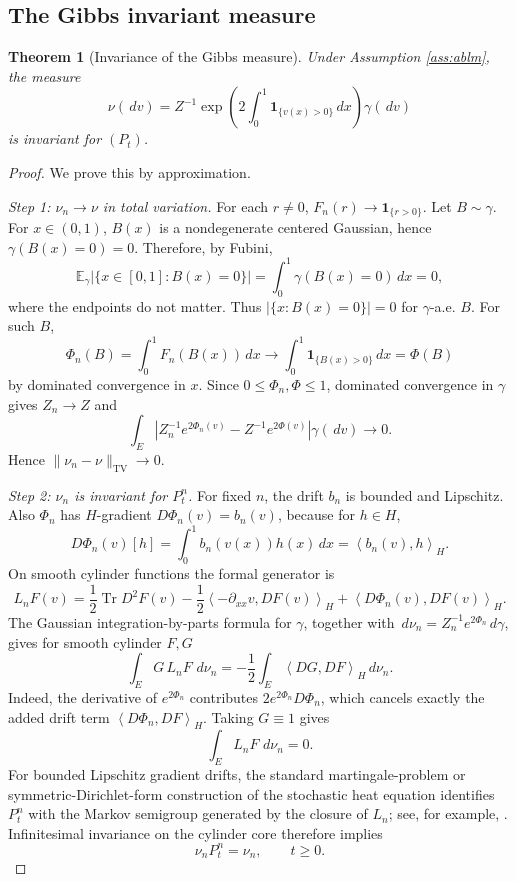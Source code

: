 \documentclass[12pt]{article}
\newcommand{\E}{\mathbb E}
\newcommand{\1}{\mathbf 1}
\newcommand{\dd}{\,d}
\newcommand{\TV}{\mathrm{TV}}
\newcommand{\ip}[2]{\left\langle #1,#2\right\rangle}
\theoremstyle{plain}
\newtheorem{theorem}{Theorem}[section]
\theoremstyle{definition}
\theoremstyle{remark}
\numberwithin{equation}{section}
\begin{document}
\subsection{The Gibbs invariant measure}

\begin{theorem}[Invariance of the Gibbs measure]\label{thm:invariance}
Under Assumption \ref{ass:ablm}, the measure
\[
\nu(\dd v)
=
Z^{-1}\exp\!\left(2\int_0^1\1_{\{v(x)>0\}}\dd x\right)\gamma(\dd v)
\]
is invariant for \((P_t)\).
\end{theorem}

\begin{proof}
We prove this by approximation.

\emph{Step 1: \(\nu_n\to\nu\) in total variation.}
For each \(r\ne0\), \(F_n(r)\to\1_{\{r>0\}}\).  Let \(B\sim\gamma\).  For
\(x\in(0,1)\), \(B(x)\) is a nondegenerate centered Gaussian, hence
\(\gamma(B(x)=0)=0\).  Therefore, by Fubini,
\[
\E_\gamma\bigl|\{x\in[0,1]:B(x)=0\}\bigr|
=\int_0^1\gamma(B(x)=0)\dd x=0,
\]
where the endpoints do not matter.  Thus \(|\{x:B(x)=0\}|=0\) for
\(\gamma\)-a.e. \(B\).  For such \(B\),
\[
\Phi_n(B)=\int_0^1F_n(B(x))\dd x
\longrightarrow
\int_0^1\1_{\{B(x)>0\}}\dd x=\Phi(B)
\]
by dominated convergence in \(x\).  Since \(0\le\Phi_n,\Phi\le1\), dominated
convergence in \(\gamma\) gives \(Z_n\to Z\) and
\[
\int_E\left|
Z_n^{-1}e^{2\Phi_n(v)}-Z^{-1}e^{2\Phi(v)}
\right|\gamma(\dd v)\longrightarrow0.
\]
Hence \(\|\nu_n-\nu\|_{\TV}\to0\).

\emph{Step 2: \(\nu_n\) is invariant for \(P_t^n\).}
For fixed \(n\), the drift \(b_n\) is bounded and Lipschitz.  Also
\(\Phi_n\) has \(H\)-gradient \(D\Phi_n(v)=b_n(v)\), because for
\(h\in H\),
\[
D\Phi_n(v)[h]=\int_0^1b_n(v(x))h(x)\dd x=\ip{b_n(v)}{h}_H.
\]
On smooth cylinder functions the formal generator is
\[
L_nF(v)=\frac12\operatorname{Tr}D^2F(v)
-\frac12\ip{-\partial_{xx}v}{DF(v)}_H
+\ip{D\Phi_n(v)}{DF(v)}_H.
\]
The Gaussian integration-by-parts formula for \(\gamma\), together with
\(\dd\nu_n=Z_n^{-1}e^{2\Phi_n}\dd\gamma\), gives for smooth cylinder \(F,G\)
\[
\int_EG\,L_nF\,\dd\nu_n
=
-\frac12\int_E\ip{DG}{DF}_H\dd\nu_n.
\]
Indeed, the derivative of \(e^{2\Phi_n}\) contributes
\(2e^{2\Phi_n}D\Phi_n\), which cancels exactly the added drift term
\(\ip{D\Phi_n}{DF}_H\).  Taking \(G\equiv1\) gives
\[
\int_EL_nF\,\dd\nu_n=0.
\]
For bounded Lipschitz gradient drifts, the standard martingale-problem or
symmetric-Dirichlet-form construction of the stochastic heat equation identifies
\(P_t^n\) with the Markov semigroup generated by the closure of \(L_n\); see,
for example, \cite{DPZ14,MR92}.  Infinitesimal invariance on the cylinder core
therefore implies
\[
\nu_nP_t^n=\nu_n,\qquad t\ge0.
\]


\end{proof}
\end{document}
